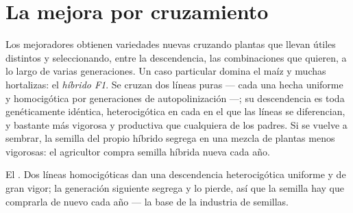 \section{La mejora por cruzamiento}

\begin{proposition}\label{prop:g12:domesticated-plants:hybrids}
Los mejoradores obtienen variedades nuevas cruzando plantas que llevan
 útiles distintos y seleccionando, entre la descendencia, las
combinaciones que quieren, a lo largo de varias generaciones. Un caso
particular domina el maíz y muchas hortalizas: el \emph{híbrido
F1}. Se cruzan dos líneas puras --- cada una hecha
uniforme y homocigótica por generaciones de autopolinización ---; su
descendencia es toda genéticamente idéntica, heterocigótica en cada 
en el que las líneas se diferencian, y bastante más vigorosa y
productiva que cualquiera de los padres. Si se vuelve a sembrar, la
semilla del propio híbrido segrega en una mezcla de plantas menos
vigorosas: el agricultor compra semilla híbrida nueva cada año.
\end{proposition}
\admitted

\begin{omfigure}

{\small El . Dos líneas homocigóticas dan una descendencia
heterocigótica uniforme y de gran vigor; la generación siguiente
segrega y lo pierde, así que la semilla hay que comprarla de nuevo cada
año --- la base de la industria de semillas.}
\end{omfigure}

